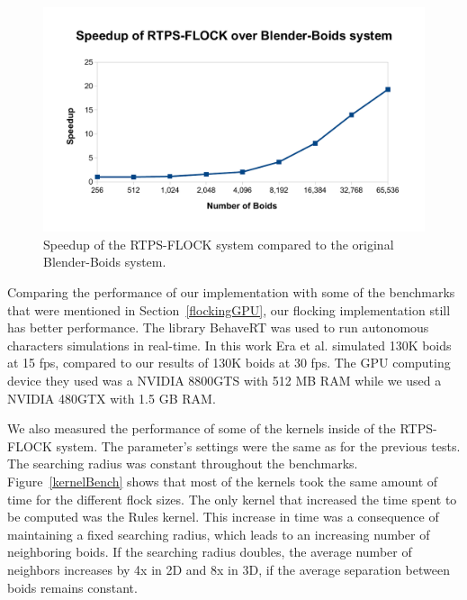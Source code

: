 \begin{figure}[htbp]
\begin{center}
\includegraphics[scale=0.7]{figures/speedup.pdf}
\caption{Speedup of the RTPS-FLOCK system compared to the original Blender-Boids system.}
\label{speedup}
\end{center}
\end{figure}

Comparing the performance of our implementation with some of the benchmarks that were mentioned in Section~\ref{flockingGPU}, our flocking implementation still has better performance. The library BehaveRT was used to run autonomous characters simulations in real-time. 
In this work Era et al. simulated 130K boids at 15 fps, compared to our results of 130K boids at 30 fps. The GPU computing device they used was a NVIDIA 8800GTS with 512 MB RAM while we used a NVIDIA 480GTX with 1.5 GB RAM. 

We also measured the performance of some of the kernels inside of the RTPS-FLOCK system. The parameter's settings were the same as for the previous tests. The searching radius was constant throughout the benchmarks. Figure~\ref{kernelBench} shows that most of the kernels took the same amount of time for the different flock sizes. The only kernel that increased the time spent to be computed was the Rules kernel. This increase in time was a consequence of maintaining a fixed searching radius, which leads to an increasing number of neighboring boids. If the searching radius doubles, the average number of neighbors increases by 4x in 2D and 8x in 3D, if the average separation between boids 
remains constant. 

